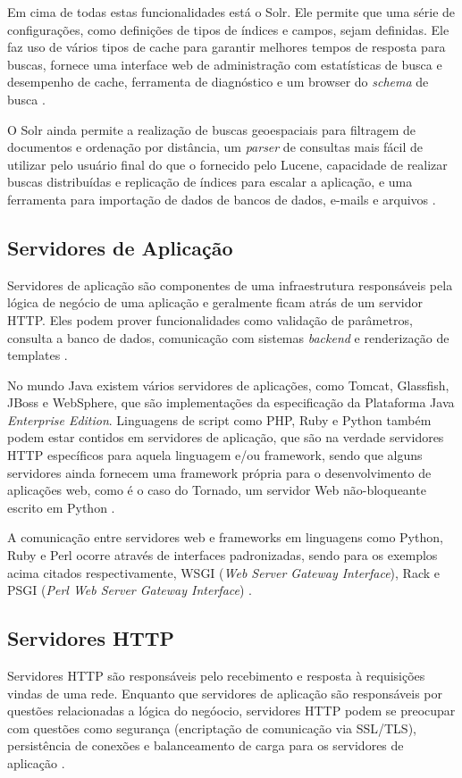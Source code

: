 \documentclass[diss]{template/setrem}
\begin{document}
Em cima de todas estas funcionalidades está o Solr. Ele permite que uma série de configurações, como definições de tipos de índices e campos, sejam definidas. Ele faz uso de vários tipos de cache para garantir melhores tempos de resposta para buscas, fornece uma interface web de administração com estatísticas de busca e desempenho de cache, ferramenta de diagnóstico e um browser do \emph{schema} de busca \citep{Smiley2011}.

O Solr ainda permite a realização de buscas geoespaciais para filtragem de documentos e ordenação por distância, um \emph{parser} de consultas mais fácil de utilizar pelo usuário final do que o fornecido pelo Lucene, capacidade de realizar buscas distribuídas e replicação de índices para escalar a aplicação, e uma ferramenta para importação de dados de bancos de dados, e-mails e arquivos \citep{Smiley2011}.

\subsection{Servidores de Aplicação}
Servidores de aplicação são componentes de uma infraestrutura responsáveis pela lógica de negócio de uma aplicação e geralmente ficam atrás de um servidor HTTP. Eles podem prover funcionalidades como validação de parâmetros, consulta a banco de dados, comunicação com sistemas \emph{backend} e renderização de templates \citep{Erb2012}.

No mundo Java existem vários servidores de aplicações, como Tomcat, Glassfish, JBoss e WebSphere, que são implementações da especificação da Plataforma Java \emph{Enterprise Edition}. Linguagens de script como PHP, Ruby e Python também podem estar contidos em servidores de aplicação, que são na verdade servidores HTTP específicos para aquela linguagem e/ou framework, sendo que alguns servidores ainda fornecem uma framework própria para o desenvolvimento de aplicações web, como é o caso do Tornado, um servidor Web não-bloqueante escrito em Python  \citep{Tornado2012}.

A comunicação entre servidores web e frameworks em linguagens como Python, Ruby e Perl ocorre através de interfaces padronizadas, sendo para os exemplos acima citados respectivamente, WSGI (\emph{Web Server Gateway Interface}), Rack e PSGI (\emph{Perl Web Server Gateway Interface}) \citep{Forcier2008, Ruby2009}.

\subsection{Servidores HTTP}
Servidores HTTP são responsáveis pelo recebimento e resposta à requisições vindas de uma rede. Enquanto que servidores de aplicação são responsáveis por questões relacionadas a lógica do negóocio, servidores HTTP podem se preocupar com questões como segurança (encriptação de comunicação via SSL/TLS), persistência de conexões e balanceamento de carga para os servidores de aplicação \citep{Erb2012}.
\end{document}
